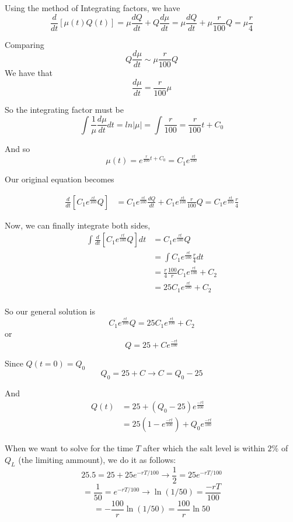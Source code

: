 Using the method of Integrating factors, we have
$$
\frac{d}{dt}\left[\mu(t)Q(t)\right] = \mu\frac{dQ}{dt} + Q \frac{d\mu}{dt}
= \mu \frac{d Q}{dt} + \mu \frac{r}{100}Q = \mu \frac{r}{4}
$$

Comparing
$$
Q \frac{d\mu}{dt} \sim \mu \frac{r}{100}Q
$$
We have that
$$
\frac{d\mu}{dt} = \frac{r}{100} \mu
$$

So the integrating factor must be
$$
\int \frac{1}{\mu} \frac{d\mu}{dt} dt = ln |\mu| 
= \int \frac{r}{100} = \frac{r}{100}t + C_0
$$

And so
$$
\mu(t) = e^{\frac{r}{100}t + C_0} = C_1e^{\frac{rt}{100}}
$$

Our original equation becomes

\begin{align*}
    \frac{d}{dt} \left[ C_1e^{\frac{rt}{100}} Q \right]  &=   
    C_1e^{\frac{rt}{100}} \frac{d Q}{dt} + C_1e^{\frac{rt}{100}} \frac{r}{100}Q = C_1e^{\frac{rt}{100}} \frac{r}{4}
\end{align*}

Now, we can finally integrate both sides,
\begin{align*}
    \int \frac{d}{dt} \left[ C_1e^{\frac{rt}{100}} Q \right] dt  &=  C_1e^{\frac{rt}{100}} Q     \\
    &= \int C_1e^{\frac{rt}{100}} \frac{r}{4} dt    \\
    &= \frac{r}{4} \frac{100}{r} C_1e^{\frac{rt}{100}} + C_2 \\
    &= 25 C_1e^{\frac{rt}{100}} + C_2 \\
\end{align*}

So our general solution is
$$
C_1e^{\frac{rt}{100}} Q = 25 C_1e^{\frac{rt}{100}} + C_2
$$
or
$$
Q = 25 + C e^{\frac{-rt}{100}}
$$

Since $Q(t=0) = Q_0$
$$
Q_0 = 25 + C \rightarrow C = Q_0 - 25
$$

And
\begin{align*}
    Q(t) &= 25 + (Q_0 - 25) e^{\frac{-rt}{100}} \\
    &= 25(1 - e^{\frac{-rt}{100}}) + Q_0 e^{\frac{-rt}{100}}
\end{align*}

When we want to solve for the time $T$ after which the salt level is within $2\%$ of $Q_L$ (the limiting ammount),
we do it as follows:
$$
25.5 = 25 + 25 e^{-rT/100} \rightarrow \frac{1}{2} = 25 e^{-rT/100}
$$
$$
= \frac{1}{50} = e^{-rT/100} \rightarrow \ln (1/50) = \frac{-rT}{100}
$$
$$
= - \frac{100}{r} \ln(1/50) = \frac{100}{r} \ln{50}
$$



